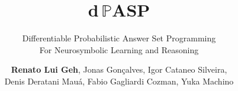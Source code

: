 \documentclass[aspectratio=169]{beamer}
\newcommand{\dpasp}{\textbf{\textcolor{palette-purple}{$\bm{d}$}\,\textcolor{palette-orange}{$\pmb{\mathbb{P}}$}\textcolor{palette-green}{A}\textcolor{palette-blue}{S}\textcolor{palette-yellow}{P}}}
\newcommand{\ccimg}{%
  \hspace{0.25cm}\def\svgwidth{0.1\textwidth}%
}
\def\pagenumbering{}
\begin{document}
\author{\small\textbf{Renato Lui Geh}, Jonas Gonçalves, Igor Cataneo Silveira,\texorpdfstring{\\}{
}Denis Deratani Mauá, Fabio Gagliardi Cozman, Yuka Machino}
\subtitle{\texorpdfstring{\normalsize\color{black}\itshape}{}\textcolor{palette-blue}{D}ifferentiable \textcolor{palette-blue}{P}robabilistic \textcolor{palette-blue}{A}nswer \textcolor{palette-blue}{S}et \textcolor{palette-blue}{P}rogramming\\For Neurosymbolic Learning and Reasoning}
\title{\rmfamily\bfseries\Huge\dpasp}


\let\pagenumbering\undefined
\begin{frame}
    \titlepage
    \ccimg
\end{frame}
\def\pagenumbering{}

\end{document}
